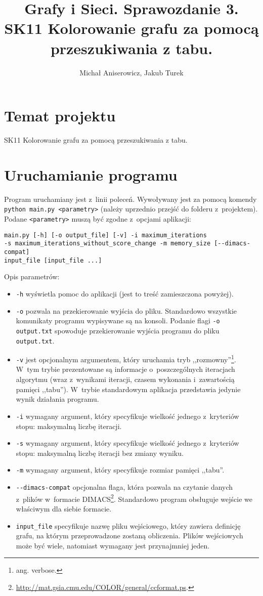 \documentclass[a4paper,10pt]{article}
\title{Grafy i Sieci. Sprawozdanie 3. \\ \small{SK11 Kolorowanie grafu za pomocą przeszukiwania z tabu.}}
\author{Michał Aniserowicz, Jakub Turek}
\date{}
\begin{document}
\maketitle

\section*{Temat projektu}

SK11 Kolorowanie grafu za pomocą przeszukiwania z tabu.

\section*{Uruchamianie programu}

Program uruchamiany jest z~linii poleceń. Wywoływany jest za pomocą komendy \verb+python main.py <parametry>+ (należy uprzednio przejść do folderu z~projektem). Podane \verb+<parametry>+ muszą być zgodne z~opcjami aplikacji:

\begin{verbatim}
main.py [-h] [-o output_file] [-v] -i maximum_iterations
-s maximum_iterations_without_score_change -m memory_size [--dimacs-compat]
input_file [input_file ...]
\end{verbatim}

Opis parametrów:

\begin{itemize}
    \item \verb+-h+ wyświetla pomoc do aplikacji (jest to treść zamieszczona powyżej).
    \item \verb+-o+ pozwala na przekierowanie wyjścia do pliku. Standardowo wszystkie komunikaty programu wypisywane są na konsoli. Podanie flagi \verb+-o output.txt+ spowoduje przekierowanie wyjścia programu do pliku \verb+output.txt+.
    \item \verb+-v+ jest opcjonalnym argumentem, który uruchamia tryb ,,rozmowny''\footnote{ang. verbose.}. W~tym trybie prezentowane są informacje o~poszczególnych iteracjach algorytmu (wraz z~wynikami iteracji, czasem wykonania i~zawartością pamięci ,,tabu''). W~trybie standardowym aplikacja przedstawia jedynie wynik działania programu.
    \item \verb+-i+ wymagany argument, który specyfikuje wielkość jednego z~kryteriów stopu: maksymalną liczbę iteracji. 
    \item \verb+-s+ wymagany argument, który specyfikuje wielkość jednego z~kryteriów stopu: maksymalną liczbę iteracji bez zmiany wyniku.
    \item \verb+-m+ wymagany argument, który specyfikuje rozmiar pamięci ,,tabu''.
    \item \verb+--dimacs-compat+ opcjonalna flaga, która pozwala na czytanie danych z~plików w~formacie DIMACS\footnote{\url{http://mat.gsia.cmu.edu/COLOR/general/ccformat.ps}.}. Standardowo program obsługuje wejście we właściwym dla siebie formacie.
    \item \verb+input_file+ specyfikuje nazwę pliku wejściowego, który zawiera definicję grafu, na którym przeprowadzone zostaną obliczenia. Plików wejściowych może być wiele, natomiast wymagany jest przynajmniej jeden.
 \end{itemize}
\end{document}
